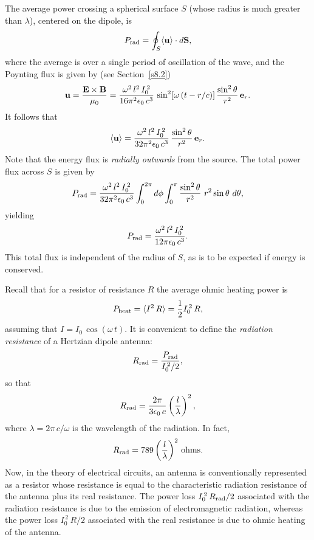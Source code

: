 The average power crossing a spherical surface $S$ (whose radius is much greater than
$\lambda$), centered on the dipole,  is
\begin{equation}
P_{\rm rad} = \oint_S \langle {\bf u}\rangle\cdot d{\bf S},
\end{equation}
where the average is over a single period of oscillation of the wave, and
the Poynting flux is given by (see Section~\ref{s8.2})
\begin{equation}
{\bf u} = \frac{ {\bf E} \times{\bf B}}{\mu_0} = \frac{\omega^2 \,l^2 \,I_0^{\,2}}
{16\pi^2 \epsilon_0\, c^3}\, \sin^2[\omega\,(t-r/c)] \,\frac{\sin^2\theta}{r^2}\,
{\bf e}_r.
\end{equation}
It follows that
\begin{equation}\label{e9.20}
\langle {\bf u}\rangle = \frac{\omega^2\, l^2\, I_0^{\,2}}{32\pi^2\epsilon_0\, c^3}\, \frac{\sin^2\theta}
{r^2}\, {\bf e}_r.
\end{equation}
Note that the energy flux is {\em radially outwards}\/ from the source. The total power 
flux across $S$ is given by
\begin{equation}
P_{\rm rad} = \frac{\omega^2 \,l^2\, I_0^{\,2}}{32\pi^2 \epsilon_0\, c^3}
\int_0^{2\pi} d\phi \int_0^\pi \frac{\sin^2\theta}{r^2} \,\, r^2\sin\theta\,\,
d\theta,
\end{equation}
yielding
\begin{equation}
P_{\rm rad} = \frac{\omega^2\, l^2\, I_0^{\,2}}{12\pi \epsilon_0\, c^3}.
\end{equation}
This total flux is independent of the radius of $S$, as is to be expected if
energy is conserved. 

Recall that for a resistor of resistance $R$ the average ohmic heating power is
\begin{equation}
P_{\rm heat} = \langle I^2 \,R\rangle = \frac{1}{2} I_0^{\,2}\, R,
\end{equation}
assuming that $I= I_0 \,\cos(\omega\, t)$. It is convenient to define the {\em radiation
resistance}\/ of a Hertzian dipole antenna:
\begin{equation}
R_{\rm rad} = \frac{P_{\rm rad}}{I_0^{\,2}/2},
\end{equation}
so that
\begin{equation}
R_{\rm rad} = \frac{2\pi}{3\epsilon_0 \,c} \left(\frac{l}{\lambda}\right)^2,
\end{equation}
where $\lambda = 2\pi\,c/\omega$ is the wavelength of the radiation.
In fact,
\begin{equation}\label{e9.25}
R_{\rm rad} = 789 \left(\frac{l}{\lambda}\right)^2\,{\rm ohms}.
\end{equation}
Now, in the theory 
of electrical circuits, an antenna is conventionally represented as
a resistor whose resistance is equal
to the characteristic radiation resistance of the antenna plus its real
resistance. The power loss $I_0^{\,2}\,R_{\rm rad}/2$
associated with the radiation resistance
 is due to the emission of electromagnetic radiation, whereas the power loss
$ I_0^{\,2}\,R/2$ associated with
 the real resistance is
due to ohmic heating of the antenna.

